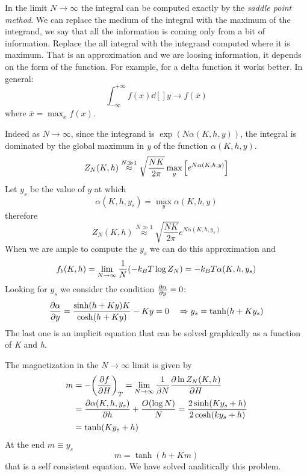 \documentclass[../main/main.tex]{subfiles}
\begin{document}
\begin{remark}
In the limit \( N \rightarrow \infty  \) the integral can be computed exactly by the \emph{saddle point method}.
We can replace the medium of the integral with the maximum of the integrand, we say that all the information is coming only from a bit of information. Replace the all integral with the integrand computed where it is maximum. That is an approximation and we are loosing information, it depends on the form of the function. For example, for a delta function it works better. In general:
\begin{equation}
  \int_{-\infty }^{+ \infty } f(x) \dd[]{y} \rightarrow f(\bar{x} )
\end{equation}
where \( \bar{x} = \max_{x} f(x)  \).
\end{remark}


Indeed as \( N \rightarrow \infty  \), since the integrand is \( \exp (N \alpha (K,h,y))  \), the integral is dominated by the global maximum in \emph{y} of the function \( \alpha (K,h,y) \).
\begin{equation}
  Z_N (K,h) \overset{N \gg1 }{\approx}  \sqrt{\frac{N K}{2 \pi }} \max_y \qty[e ^{N \alpha(K,h,y) } ]
\end{equation}
Let \( y_s \) be the value of \( y \) at which
\begin{equation}
  \alpha (K,h,y_s) = \max_y \alpha (K,h,y)
\end{equation}
therefore
\begin{equation}
  Z_N (K,h) \overset{N \gg1 }{\approx} \sqrt{\frac{N K}{2 \pi }} e^{N \alpha (K,h,y_s)}
\end{equation}
When we are ample to compute the \( y_s \) we can do this approximation and
\begin{equation}
  f_b (K,h)= \lim_{N \rightarrow \infty } \frac{1}{N} \qty(- k_B T \log{Z_N}) = -k_B T \alpha (K,h,y_s)
\end{equation}
Looking for \( y_s \) we consider the condition \( \pdv{\alpha }{y} = 0  \):
\begin{equation}
  \pdv{\alpha }{y} = \frac{\sinh (h+Ky)K}{\cosh (h+Ky)} - Ky = 0 \quad   \Rightarrow y_s = \tanh (h+Ky_s)
\end{equation}
The last one is an implicit equation that can be solved graphically as a function of \emph{K} and \emph{h}.

The magnetization in the \( N \rightarrow \infty  \) limit is given by
\begin{equation}
\begin{split}
m  &= - \qty( \pdv{f}{H})_T = \lim_{N \rightarrow \infty } \frac{1}{\beta N} \pdv{\ln{Z_N(K,h)} }{H}   \\
& =  \pdv{\alpha (K,h,y_s) }{h}  + \frac{O ( \log{N} )}{N} = \frac{2 \sinh(Ky_s+h)}{2 \cosh(ky_s+h)} \\
& = \tanh (K y_s +h)
\end{split}
\end{equation}
At the end \( m \equiv y_s \)
\begin{equation}
  m = \tanh (h+Km)
\end{equation}
that is a self consistent equation. We have solved analitically this problem.
\end{document}
